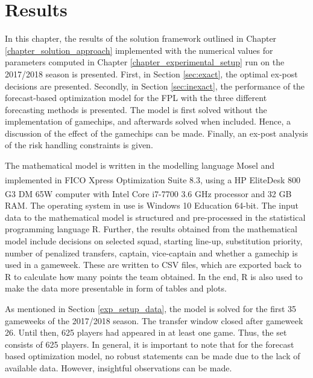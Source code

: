 
\chapter{Results} \label{chapter_computational_study}

In this chapter, the results of the solution framework outlined in Chapter \ref{chapter_solution_approach} implemented with the numerical values for parameters computed in Chapter \ref{chapter_experimental_setup} run on the 2017/2018 season is presented. First, in Section \ref{sec:exact}, the optimal ex-post decisions are presented. Secondly, in Section \ref{sec:inexact}, the performance of the forecast-based optimization model for the FPL with the three different forecasting methods is presented. The model is first solved without the implementation of gamechips, and afterwards solved when included. Hence, a discussion of the effect of the gamechips can be made. Finally, an ex-post analysis of the risk handling constraints is given. 

\newpar

The mathematical model is written in the modelling language Mosel and implemented in FICO\textsuperscript {\textregistered} Xpress Optimization Suite 8.3, using a HP EliteDesk 800 G3 DM 65W computer with Intel\textsuperscript{\textregistered} Core\textsuperscript{\texttrademark} i7-7700 3.6 GHz processor and 32 GB RAM. The operating system in use is Windows 10 Education 64-bit. The input data to the mathematical model is structured and pre-processed in the statistical programming language R. Further, the results obtained from the mathematical model include decisions on selected squad, starting line-up, substitution priority, number of penalized transfers, captain, vice-captain and whether a gamechip is used in a gameweek. These are written to CSV files, which are exported back to R to calculate how many points the team obtained. In the end, R is also used to make the data more presentable in form of tables and plots. 

\newpar

As mentioned in Section \ref{exp_setup_data}, the model is solved for the first 35 gameweeks of the 2017/2018 season. The transfer window closed after gameweek 26. Until then, 625 players had appeared in at least one game. Thus, the set consists of 625 players. In general, it is important to note that for the forecast based optimization model, no robust statements can be made due to the lack of available data. However, insightful observations can be made. 

